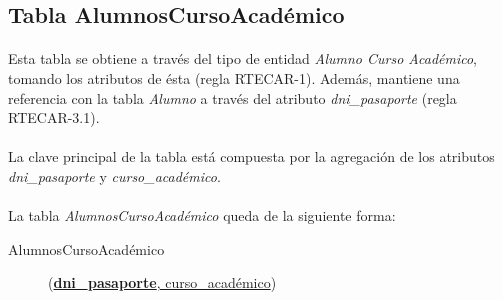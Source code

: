    \subsection{Tabla AlumnosCursoAcadémico}

      \paragraph{}Esta tabla se obtiene a través del tipo de entidad
      \textit{Alumno Curso Académico}, tomando los atributos de ésta (regla
      RTECAR-1). Además, mantiene una referencia con la tabla \textit{Alumno} a
      través del atributo \textit{dni\_pasaporte} (regla RTECAR-3.1).

      \paragraph{}La clave principal de la tabla está compuesta por la
      agregación de los atributos \textit{dni\_pasaporte} y
      \textit{curso\_académico}.

      \paragraph{}La tabla \textit{AlumnosCursoAcadémico} queda de la siguiente
      forma:

      \begin{description}
         \item[AlumnosCursoAcadémico] \begin{flushleft}(\underline{\textbf{dni\_pasaporte},
         curso\_académico})\end{flushleft}
      \end{description}
